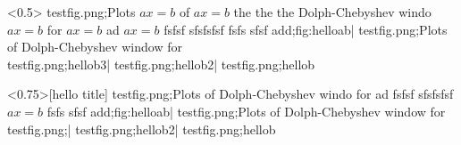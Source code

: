 \begin{tcbfigbox}<0.5\columnwidth>%
    \tcbfigboxlist
    {
        testfig.png;Plots $ax=b$ of $ax=b$ the the the Dolph-Chebyshev windo $ax=b$ for $ax=b$ ad $ax=b$ fsfsf sfsfsfsf fsfs sfsf add;fig:helloab|
        testfig.png;Plots of Dolph-Chebyshev window for
        \\
        testfig.png;hellob3|
        testfig.png;hellob2|
        testfig.png;hellob
    }%
\end{tcbfigbox}
\begin{tcbfigbox}<0.75\columnwidth>[hello title]%
    \tcbfigboxlist
    {
        testfig.png;Plots of Dolph-Chebyshev windo for ad fsfsf sfsfsfsf $ax=b$ fsfs sfsf add;fig:helloab|
        testfig.png;Plots of Dolph-Chebyshev window for
        \\
        testfig.png;|
        testfig.png;hellob2|
        testfig.png;hellob
    }%
\end{tcbfigbox}
\endinput 